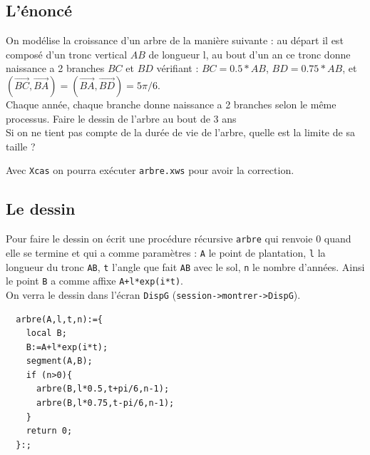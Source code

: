 \documentclass[a4paper,11pt]{book}
\begin{document}
\subsection{L'\'enonc\'e}
On mod\'elise la croissance d'un arbre de la mani\`ere suivante :
au d\'epart il est compos\'e d'un tronc vertical $AB$ de longueur l, au bout 
d'un an ce tronc donne naissance a 2 branches $BC$ et $BD$ v\'erifiant :
$BC=0.5*AB$, $BD=0.75*AB$, et \\
$(\overrightarrow{BC},\overrightarrow{BA})=(\overrightarrow{BA},\overrightarrow{BD})=5\pi/6$.\\
Chaque ann\'ee, chaque branche donne naissance a 2 branches selon le m\^eme 
processus.
Faire le dessin de l'arbre au bout de 3 ans\\
Si on ne tient pas compte de la dur\'ee de vie de l'arbre, quelle est la 
limite de sa taille ?

Avec {\tt Xcas} on pourra ex\'ecuter {\tt arbre.xws} pour avoir la correction.
\subsection{Le dessin}
Pour faire le dessin on \'ecrit une proc\'edure r\'ecursive {\tt arbre}  
qui renvoie 0 quand elle se termine et qui a comme param\`etres :
{\tt A} le point de plantation, {\tt l} la longueur du tronc {\tt AB}, {\tt t}
 l'angle que fait {\tt AB} avec le sol, {\tt n} le nombre d'ann\'ees.
Ainsi le point {\tt B} a comme affixe {\tt A+l*exp(i*t)}.\\
On verra le dessin dans l'\'ecran {\tt DispG} ({\tt session->montrer->DispG}).
\begin{verbatim}
  arbre(A,l,t,n):={
    local B;
    B:=A+l*exp(i*t);
    segment(A,B);
    if (n>0){
      arbre(B,l*0.5,t+pi/6,n-1);
      arbre(B,l*0.75,t-pi/6,n-1);
    } 
    return 0;
  }:;
\end{verbatim}
\end{document}

